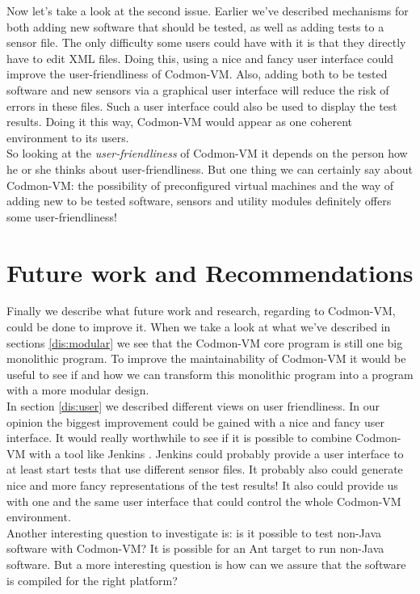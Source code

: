 \documentclass{article}
\newcommand{\project}{Codmon-VM}
\begin{document}
\noindent Now let's take a look at the second issue. Earlier we've described mechanisms for both adding new software that should be tested, as well as adding tests to a sensor file. The only difficulty 
some users could have with it is that they directly have to edit XML files. Doing this, using a nice and fancy user interface could improve the user-friendliness of \project{}. Also, adding both to be 
tested software and new sensors via a graphical user interface will reduce the risk of errors in these files. Such a user interface could also be used to display the test results. Doing it this way, 
\project{} would appear as one coherent environment to its users.\\

\noindent So looking at the \emph{user-friendliness} of \project{} it depends on the person how he or she thinks about user-friendliness. But one thing we can certainly say about \project{}: the possibility of 
preconfigured virtual machines and the way of adding new to be tested software, sensors and utility modules definitely offers some user-friendliness!

\newpage
\section{Future work and Recommendations}
\label{sec:future}
Finally we describe what future work and research, regarding to \project{}, could be done to improve it. When we take a look at what we've described in sections \ref{dis:modular}
we see that the \project{} core program is still one big monolithic program. To improve the maintainability of \project{} it would be useful to see if and how we can transform this monolithic 
program into a program with a more modular design.\\

\noindent In section \ref{dis:user} we described different views on user friendliness. In our opinion the biggest improvement could be gained with a nice and fancy user interface. It would 
really worthwhile to see if it is possible to combine \project{} with a tool like Jenkins \cite{JenkinsDoc}. Jenkins could probably provide a user interface to at least start tests that use 
different sensor files. It probably also could generate nice and more fancy representations of the test results! It also could provide us with one and the same user interface that could control the whole \project{} 
environment.\\

\noindent Another interesting question to investigate is: is it possible to test non-Java software with \project{}? It is possible for an Ant target to run non-Java software. But a more interesting 
question is how can we assure that the software is compiled for the right platform?\\
\end{document}

